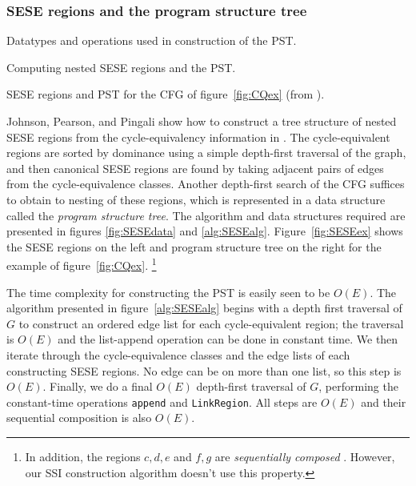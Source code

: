 \documentclass[12pt,titlepage,twoside]{article}
\newcommand*{\figscale}{1.0}
\begin{document}
\subsubsection{SESE regions and the program structure tree}
\begin{myfigure}\small
\caption{Datatypes and operations used in construction of the PST.}
\label{fig:SESEdata}\end{myfigure}
\begin{myalgorithm}\small
\caption{Computing nested SESE regions and the PST.}
\label{alg:SESEalg}\end{myalgorithm}
\begin{myfigure}\centering
\vertcenter{\renewcommand*{\figscale}{0.5}}\hspace{1cm}
\vertcenter{\renewcommand*{\figscale}{0.7}}
\caption{SESE regions and PST for the CFG of
         figure~\ref{fig:CQex} (from \cite{johnson94:pst}).}
\label{fig:SESEex}\end{myfigure}

Johnson, Pearson, and Pingali show how to construct a tree structure
of nested SESE regions from the cycle-equivalency information in
\cite{johnson94:pst}.  The cycle-equivalent regions are sorted by
dominance using a simple depth-first traversal of the graph, and then
canonical SESE regions are found by taking adjacent pairs of
edges from the cycle-equivalence classes.  Another depth-first search
of the CFG suffices to obtain to nesting of these regions,
which is represented in a data structure called the 
\emph{program structure tree}.
The algorithm and data structures required are presented in figures
\ref{fig:SESEdata} and \ref{alg:SESEalg}.  Figure~\vref{fig:SESEex}
shows the SESE regions on the left and program structure tree on
the right for the example of figure~\vref{fig:CQex}.%
\footnote{In addition, the regions ${c,d,e}$ and ${f,g}$ are
\emph{sequentially composed} \cite{johnson94:pst}. 
However, our SSI construction algorithm doesn't use this property.}

The time complexity for constructing the PST is easily seen to be
$O(E)$. The algorithm presented in figure~\vref{alg:SESEalg} begins
with a depth first traversal of $G$ to construct an ordered edge list
for each cycle-equivalent region; the traversal is $O(E)$ and the
list-append operation can be done in constant time.  We then iterate
through the cycle-equivalence classes and the edge lists of each
constructing SESE regions.  No edge can be on more than one list, so
this step is $O(E)$.  Finally, we do a final $O(E)$ depth-first
traversal of $G$, performing the constant-time operations {\tt append}
and {\tt LinkRegion}.  All steps are $O(E)$ and their sequential
composition is also $O(E)$.
\end{document}
